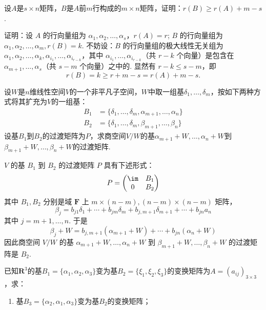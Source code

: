 \begin{exercise}
\begin{exgroup}
        \item 设$A$是$s \times n$矩阵，$B$是$A$前$m$行构成的$m \times n$矩阵，证明：$r(B) \geqslant r(A) + m - s$.
        \begin{answer}
            证明：设 $A$ 的行向量组为 $\alpha_1,\alpha_2,\ldots,\alpha_s$，$r(A)=r$; $B$ 的行向量组为 $\alpha_1,\alpha_2,\ldots,\alpha_m ,r(B)=k$.
            不妨设：$B$ 的行向量组的极大线性无关组为 $\alpha_1,\alpha_2,\ldots,\alpha_k,\alpha_{i_1},\ldots,\alpha_{i_{r-k}}$，其中 $\alpha_{i_1},\ldots,\alpha_{i_{r-k}}$（共 $r-k$ 个向量）是包含在 $\alpha_{m+1},\ldots,\alpha_s$（共 $s-m$ 个向量）之中的. 显然有 $r-k \leqslant s-m $，即
            \[r(B)=k\geqslant r+m-s=r(A)+m-s.\]
        \end{answer}
    \end{exgroup}

    \begin{exgroup}
        \item 设$W$是$n$维线性空间$V$的一个非平凡子空间，$W$中取一组基$\delta_1,\ldots,\delta_m$，按如下两种方式将其扩充为$V$的一组基：
        \begin{align*}
            B_1 & =\{\delta_1,\ldots,\delta_m,\alpha_{m+1},\ldots,\alpha_n\} \\
            B_2 & =\{\delta_1,\ldots,\delta_m,\beta_{m+1},\ldots,\beta_n\}
        \end{align*}
        设基$B_1$到$B_2$的过渡矩阵为$P$，求商空间$V/W$的基$\alpha_{m+1}+W,\ldots,\alpha_n+W$到$\beta_{m+1}+W,\ldots,\beta_n+W$的过渡矩阵.
        \begin{answer}
            $V$ 的基 $B_1$ 到 $B_2$ 的过渡矩阵 $P$ 具有下述形式：
          \[P=\begin{pmatrix}\im & B_1 \\ 0 & B_2\end{pmatrix}\]
          其中 $B_1,B_2$ 分别是域 $\mathbf{F}$ 上 $m\times (n-m),(n-m)\times (n-m)$ 矩阵，
          \[\beta_j=b_{j1}\delta_1+\cdots+b_{jm}\delta_m+b_{j,m+1}\delta_{m+1}+\cdots+b_{jn}a_n\]
          其中 $j=m+1,\ldots,n$. 于是
          \[\beta_j+W=b_{j,m+1}(\alpha_{m+1}+W)+\cdots+b_{jn}(\alpha_n+W)\]
          因此商空间 $V/W$ 的基 $\alpha_{m+1}+W,\ldots,\alpha_n+W$ 到 $\beta_{m+1}+W,\ldots,\beta_n+W$ 的过渡矩阵是 $B_2$.
        \end{answer}

        \item 已知$\mathbf{R}^3$的基$B_1=\{\alpha_1,\alpha_2,\alpha_3\}$变为基$B_2=\{\xi_1,\xi_2,\xi_3\}$的变换矩阵为$A=(a_{ij})_{3 \times 3}$，求：
        \begin{enumerate}
            \item 基$B_3=\{\alpha_2,\alpha_1,\alpha_3\}$变为基$B_2$的变换矩阵；


\end{enumerate}
\end{exgroup}
\end{exercise}
